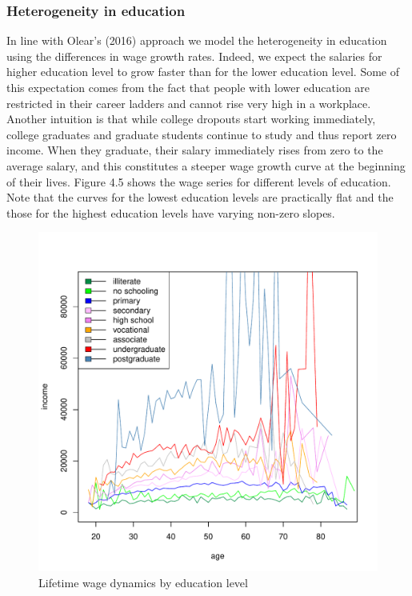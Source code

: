 \subsubsection{Heterogeneity in education}
In line with Olear's (2016) approach we model the heterogeneity in education using the differences in wage growth rates. Indeed, we expect the salaries for higher education level to grow faster than for the lower education level. Some of this expectation comes from the fact that people with lower education are restricted in their career ladders and cannot rise very high in a workplace. Another intuition is that while college dropouts start working immediately, college graduates and graduate students continue to study and thus report zero income. When they graduate, their salary immediately rises from zero to the average salary, and this constitutes a steeper wage growth curve at the beginning of their lives. Figure 4.5 shows the wage series for different levels of education. Note that the curves for the lowest education levels are practically flat and the those for the highest education levels have varying non-zero slopes. 

\begin{figure}[h]
	\centering
	\includegraphics[scale=0.6]{figs/wage2educ.pdf}
	\caption{Lifetime wage dynamics by education level}
\end{figure}

